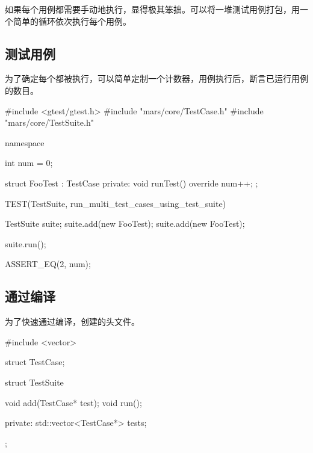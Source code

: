 \begin{content}

如果每个用例都需要手动地执行，显得极其笨拙。可以将一堆测试用例打包，用一个简单的循环依次执行每个用例。

\subsection{测试用例}

为了确定每个都被执行，可以简单定制一个计数器，用例执行后，断言已运行用例的数目。

\begin{leftbar}
 \begin{c++}[caption={\ttfamily{test/mars/core/TestSuiteSpec.cc}}]
#include <gtest/gtest.h>
#include "mars/core/TestCase.h"
#include "mars/core/TestSuite.h"

namespace {
  int num = 0;

  struct FooTest : TestCase {
  private:
    void runTest() override {
      num++;
    }
  };
}

TEST(TestSuite, run_multi_test_cases_using_test_suite) {
  TestSuite suite;
  suite.add(new FooTest);
  suite.add(new FooTest);

  suite.run();

  ASSERT_EQ(2, num);
}
 \end{c++}
\end{leftbar}

\subsection{通过编译}

为了快速通过编译，创建的头文件。

\begin{leftbar}
 \begin{c++}[caption={\ttfamily{include/mars/core/TestSuite.h}}]
#include <vector>

struct TestCase;

struct TestSuite {
  void add(TestCase* test);
  void run();

private:
  std::vector<TestCase*> tests;
};
 \end{c++}
\end{leftbar}

\begin{story}
  \begin{center}
  \end{center}


\end{story}
\end{content}
